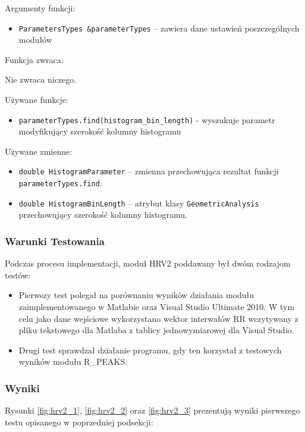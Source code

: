 \documentclass[a4paper, 11pt]{article}
\begin{document}
\medskip{}


Argumenty funkcji:
\begin{itemize}
\item \verb+ParametersTypes &parameterTypes+ -- zawiera dane ustawień poszczególnych
modułów
\end{itemize}
\medskip{}


Funkcja zwraca:

Nie zwraca niczego. 

\medskip{}


Używane funkcje:
\begin{itemize}
\item \verb+parameterTypes.find(histogram_bin_length)+
- wyszukuje parametr modyfikujący szerokość kolumny histogramu\medskip{}

\end{itemize}
Używane zmienne:
\begin{itemize}
\item \verb+double HistogramParameter+ -- zmienna przechowująca rezultat funkcji \verb+parameterTypes.find+.
\item \verb+double HistogramBinLength+ -- atrybut klasy \verb+GeometricAnalysis+ przechowujący
szerokość kolumny histogramu.
\end{itemize}


\subsubsection{Warunki Testowania}
\label{sec:hrv2:tests}

Podczas procesu implementacji, moduł HRV2 poddawany był dwóm rodzajom
testów:
\begin{itemize}
\item Pierwszy test polegał na porównaniu wyników działania modułu zaimplementowanego
w Matlabie oraz Visual Studio Ultimate 2010. W tym celu jako dane
wejściowe wykorzystano wektor interwałów RR wczytywany z pliku tekstowego
dla Matlaba z tablicy jednowymiarowej dla Visual Studio.
\item Drugi test sprawdzał działanie programu, gdy ten korzystał z testowych
wyników modułu R\_PEAKS.
\end{itemize}

\subsubsection{Wyniki}
\label{sec:hrv2:results}

Rysunki \ref{fig:hrv2_1}, \ref{fig:hrv2_2} oraz \ref{fig:hrv2_3} prezentują wyniki pierwszego testu opisanego w poprzedniej
podsekcji:
\end{document}
